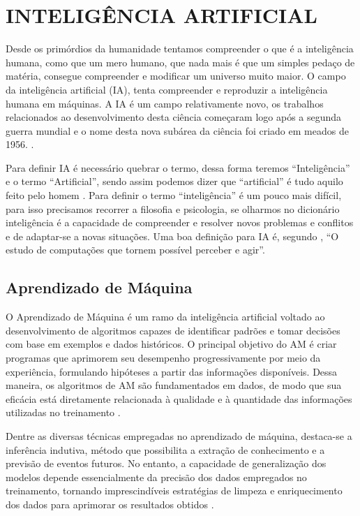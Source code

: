 \iffalse

\section{INTELIGÊNCIA ARTIFICIAL}

Desde os primórdios da humanidade tentamos compreender o que é a inteligência humana, como que um mero humano, que nada mais é que um simples pedaço de matéria, consegue compreender e modificar um universo muito maior. O campo da inteligência artificial (IA), tenta compreender e reproduzir a inteligência humana em máquinas. A IA é um campo relativamente novo, os trabalhos relacionados ao desenvolvimento desta ciência começaram logo após a segunda guerra mundial e o nome desta nova subárea da ciência foi criado em meados de 1956. \cite{russell2013inteligencia}. 



Para definir IA é necessário quebrar o termo, dessa forma teremos “Inteligência” e o termo “Artificial”, sendo assim podemos dizer que “artificial” é tudo aquilo feito pelo homem \cite{rosa2011fundamentos}. Para definir o termo “inteligência” é um pouco mais difícil, para isso precisamos recorrer a filosofia e psicologia, se olharmos no dicionário inteligência é a capacidade de compreender e resolver novos problemas e conflitos e de adaptar-se a novas situações. Uma boa definição para IA é, segundo , “O estudo de computações que tornem possível perceber e agir”.

\subsection{Aprendizado de Máquina}

O Aprendizado de Máquina é um ramo da inteligência artificial voltado ao desenvolvimento de algoritmos capazes de identificar padrões e tomar decisões com base em exemplos e dados históricos. O principal objetivo do AM é criar programas que aprimorem seu desempenho progressivamente por meio da experiência, formulando hipóteses a partir das informações disponíveis. Dessa maneira, os algoritmos de AM são fundamentados em dados, de modo que sua eficácia está diretamente relacionada à qualidade e à quantidade das informações utilizadas no treinamento \cite{ludermir2021inteligencia}.

Dentre as diversas técnicas empregadas no aprendizado de máquina, destaca-se a inferência indutiva, método que possibilita a extração de conhecimento e a previsão de eventos futuros. No entanto, a capacidade de generalização dos modelos depende essencialmente da precisão dos dados empregados no treinamento, tornando imprescindíveis estratégias de limpeza e enriquecimento dos dados para aprimorar os resultados obtidos \cite{ludermir2021inteligencia}.

